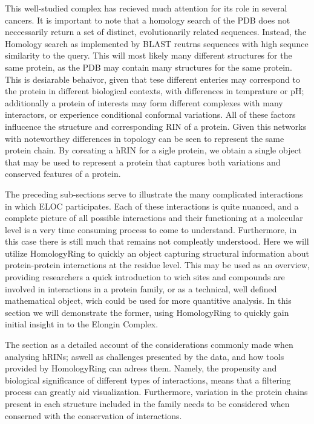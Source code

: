 
This well-studied complex has recieved much attention for its role in several cancers. 
It is important to note that a homology search of the PDB does not neccessarily return a set of distinct, evolutionarily related sequences. Instead, the Homology search as implemented by BLAST reutrns sequences with high sequnce similarity to the query. This will most likely many different structures for the same protein, as the PDB may contain many structures for the same protein.
This is desiarable behaivor, given that tese different enteries may correspond to the protein in different biological contexts, with differences in temprature or pH; additionally a protein of interests may form different complexes with many interactors, or experience conditional conformal variations. 
All of these factors influcence the structure and corresponding RIN of a protein. Given this networks with noteworthey differences in topology can be seen to represent the same protein chain. By coreating a hRIN for a sigle protein, we obtain a single object that may be used to represent a protein that captures both  variations and conserved features of a protein.


The preceding sub-sections serve to illustrate the many complicated interactions in which ELOC participates. Each of these interactions is quite nuanced, and a complete picture of all possible interactions and their functioning at a molecular level is a very time consuming process to come to understand. Furthermore, in this case there is still much that remains not compleatly understood. Here we will utilize HomologyRing to quickly an object capturing structural information about protein-protein interactions at the residue level. This may be used as an overview, providing researchers a quick introduction to wich sites and compounds are involved in interactions in a protein family, or as a technical, well defined mathematical object, wich could be used for more quantitive analysis. In this section we will demonstrate the former, using HomologyRing to quickly gain initial insight in to the Elongin Complex.

The  section as a detailed account of the considerations commonly made when analysing hRINs; aswell as challenges presented by the data, and how tools provided by HomologyRing can adress them. Namely, the propensity and biological significance of different types of interactions, means that a filtering process can greatly aid visualization. Furthermore, variation in the protein chains present in each structure included in the family needs to be considered when conserned with the conservation of interactions.

